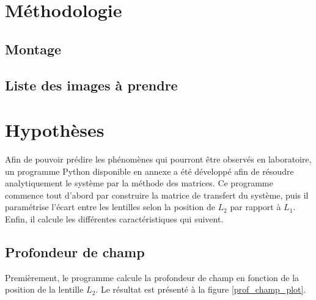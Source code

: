 \documentclass[11pt,letterpaper]{article}
\begin{document}
\section{Méthodologie}

\subsection{Montage}



\subsection{Liste des images à prendre}

\section{Hypothèses}


Afin de pouvoir prédire les phénomènes qui pourront être observés en laboratoire, un
programme Python disponible en annexe a été développé afin de résoudre analytiquement
le système par la méthode des matrices. Ce programme commence tout d'abord par construire
la matrice de transfert du système, puis il paramétrise l'écart entre les lentilles selon
la position de $L_2$ par rapport à $L_1$. Enfin, il calcule les différentes caractéristiques
qui suivent.

\subsection{Profondeur de champ}

Premièrement, le programme calcule la profondeur de champ en fonction de la position de
la lentille $L_2$. Le résultat est présenté à la figure \ref{prof_champ_plot}.
\end{document}
